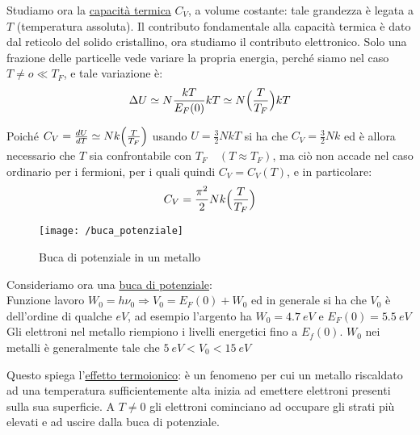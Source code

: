 Studiamo ora la \underline{capacità termica} $C_V$, a volume costante: tale grandezza è legata a $T$ (temperatura assoluta).
Il contributo fondamentale alla capacità termica è dato dal reticolo del solido cristallino, ora studiamo il contributo elettronico.
Solo una frazione delle particelle vede variare la propria energia, perché siamo nel caso $T \not = o \ll T_F$, e tale variazione è:
$$ \Delta U \simeq N \frac{ k T}{E_F(0)} kT \simeq N\Bigl(  \frac{ T}{T_F}  \Bigr)kT $$

Poiché $C_V = \frac{ dU}{dT} \simeq N k \Bigl(  \frac{ T}{T_F}  \Bigr) $ usando $U = \frac{ 3}{2} N k T$ si ha che $C_V = \frac{ 3}{2} N k$ 
ed è allora necessario che $T$ sia confrontabile con $T_F \quad (T \approx T_F)$, ma ciò non accade nel caso ordinario per i fermioni,
per i quali quindi $C_V = C_V(T)$, e in particolare:
\begin{equation}
C_V = \frac{ \pi^2}{2} N k \Bigl(  \frac{ T}{T_F}  \Bigr)
\end{equation}

\begin{figure}[h]
\centering
\texttt{[image: /buca\_potenziale]}
\caption{Buca di potenziale in un metallo}
\end{figure}

Consideriamo ora una \underline{buca di potenziale}: \\

Funzione lavoro $W_0 = h\nu_0 \Rightarrow V_0 = E_F(0) + W_0$ ed in generale si ha che $V_0$ è dell'ordine di qualche $eV$,
ad esempio l'argento ha $W_0 = \SI{4.7}{eV}$ e $ E_F(0) = \SI{5.5}{eV} $
Gli elettroni nel metallo riempiono i livelli energetici fino a $E_f(0)$. 
$W_0$ nei metalli è generalmente tale che $\SI{5}{eV} < V_0 < \SI{15}{eV} $

Questo spiega l'\underline{effetto termoionico}: è un fenomeno per cui un metallo riscaldato ad una temperatura sufficientemente alta inizia ad emettere elettroni presenti sulla sua superficie. A $T \not = 0 $ gli elettroni cominciano ad occupare gli strati più elevati e ad uscire dalla buca di potenziale.
















